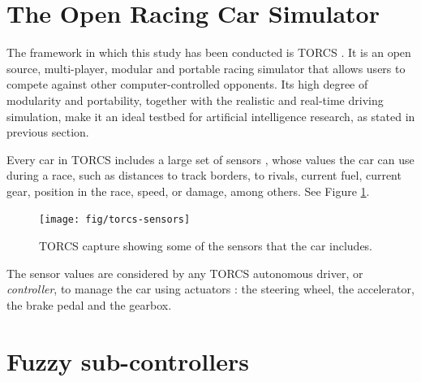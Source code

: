 \documentclass[10pt,journal,compsoc]{IEEEtran}
\begin{document}
\section{The Open Racing Car Simulator}
\label{sec:torcs}

The framework in which this study has been conducted is TORCS \cite{torcs4}. It is an open source, multi-player, modular and portable racing simulator that allows users to compete against other computer-controlled opponents.
Its high degree of modularity and portability, together with the
realistic and real-time driving simulation, make it an ideal testbed
for artificial intelligence research, as stated in previous section.

Every car in TORCS includes  a large set of sensors \cite{manualTORCS},
whose values the car can use during a race, such as distances to track borders, to rivals, current fuel, current gear, position in the race, speed, or damage, among others. See Figure \ref{fig:torcs-sensors}.

\begin{figure}[!ht] 
	\begin{center}
		\texttt{[image: fig/torcs-sensors]}
		\caption {TORCS capture showing some of the sensors that the car includes.}
		\label{fig:torcs-sensors}
	\end{center}
\end{figure}


The sensor values are considered by any TORCS autonomous driver, or
{\em controller}, to manage the car using actuators \cite{manualTORCS}: the
steering wheel, the accelerator, the brake pedal and the gearbox.   



\section{Fuzzy sub-controllers}
\label{sec:subcontrollers}


\end{document}
